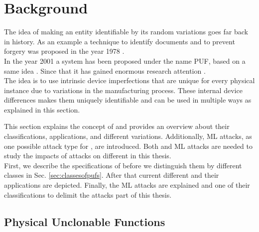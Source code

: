\chapter{Background}
\label{cap:background}

The idea of making an entity identifiable by its random variations goes far back in history.
As an example a technique to identify documents and to prevent forgery was proposed in the year 1978 \cite{1978MethodForgery}.\\
In the year 2001 a system has been proposed under the name \acf{PUF}, based on a same idea \cite{Pappu2001PhysicalFunctions}.
Since that it has gained enormous research attention \cite{Becker2015ThePUFs}.\\
The idea is to use intrinsic device imperfections that are unique for every physical instance due to variations in the manufacturing process.
These internal device differences makes them uniquely identifiable and can be used in multiple ways as explained in this section.

This section explains the concept of \pufs and provides an overview about their classifications, applications, and different variations.
Additionally, \ac{ML} attacks, as one possible attack type for \pufs, are introduced.
Both \pufs and \ac{ML} attacks are needed to study the impacts of attacks on different \pufs in this thesis.\\
First, we describe the specifications of \pufs before we distinguish them by different classes in Sec. \ref{sec:classesofpufs}.
After that current different \pufs and their applications are depicted.
Finally, the \ac{ML} attacks are explained and one of their classifications to delimit the attacks part of this thesis.


\section{Physical Unclonable Functions}
\label{sec:pyhsicalunclonablefunctions}

